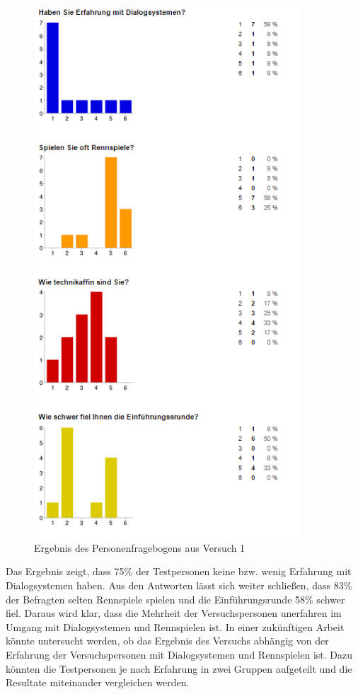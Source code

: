 \documentclass[12pt,a4paper]{scrartcl}
\begin{document}
\begin{figure}[H]
\begin{center}
\includegraphics[width=10cm]{person1.png}
\caption{Ergebnis des Personenfragebogens aus Versuch 1}
\label{fbpersonaus}
\end{center}
\end{figure}
\newpage

Das Ergebnis zeigt, dass 75\% der Testpersonen keine bzw. wenig Erfahrung mit Dialogsystemen haben. Aus den Antworten lässt sich weiter schließen, dass 83\% der Befragten selten Rennspiele spielen und die Einführungsrunde 58\% schwer fiel. Daraus wird klar, dass die Mehrheit der Versuchspersonen unerfahren im Umgang mit Dialogsystemen und Rennspielen ist. In einer zukünftigen Arbeit könnte untersucht werden, ob das Ergebnis des Versuchs abhängig von der Erfahrung der Versuchspersonen mit Dialogsystemen und Rennspielen ist. Dazu könnten die Testpersonen je nach Erfahrung in zwei Gruppen aufgeteilt und die Resultate miteinander vergleichen werden. 
\end{document}

